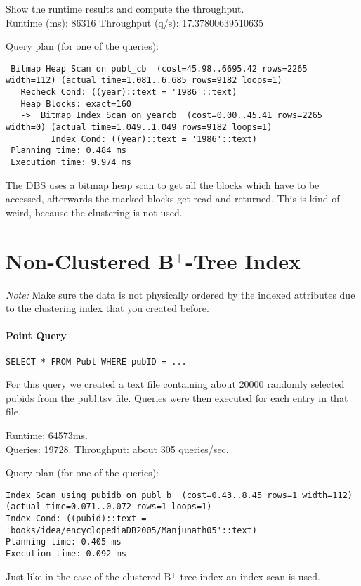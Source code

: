 \documentclass[11pt]{scrartcl}
\begin{document}
\smallskip\noindent
Show the runtime results and compute the throughput.\\
Runtime (ms): 86316
Throughput (q/s): 17.37800639510635

\smallskip\noindent
Query plan (for one of the queries):
{\small
\begin{verbatim}
 Bitmap Heap Scan on publ_cb  (cost=45.98..6695.42 rows=2265 width=112) (actual time=1.081..6.685 rows=9182 loops=1)
   Recheck Cond: ((year)::text = '1986'::text)
   Heap Blocks: exact=160
   ->  Bitmap Index Scan on yearcb  (cost=0.00..45.41 rows=2265 width=0) (actual time=1.049..1.049 rows=9182 loops=1)
         Index Cond: ((year)::text = '1986'::text)
 Planning time: 0.484 ms
 Execution time: 9.974 ms
\end{verbatim}
}
The DBS uses a bitmap heap scan to get all the blocks which have to be accessed, afterwards the marked blocks get read and returned. This is kind of weird, because the clustering is not used.

\newpage
\section{Non-Clustered B$^+$-Tree Index}

\noindent \emph{Note:} Make sure the data is not physically ordered by
the indexed attributes due to the clustering index that you created
before.

\paragraph{Point Query}

{\small
\begin{verbatim}
SELECT * FROM Publ WHERE pubID = ...
\end{verbatim}
}

\noindent
For this query we created a text file containing about 20000 randomly selected pubids from the publ.tsv file. Queries were then executed for each entry in that file.

\smallskip\noindent
Runtime: 64573ms. \\
Queries: 19728.
Throughput: about 305 queries/sec.

\smallskip\noindent
Query plan (for one of the queries):
{\small
\begin{verbatim}
Index Scan using pubidb on publ_b  (cost=0.43..8.45 rows=1 width=112) (actual time=0.071..0.072 rows=1 loops=1)
Index Cond: ((pubid)::text = 'books/idea/encyclopediaDB2005/Manjunath05'::text)
Planning time: 0.405 ms
Execution time: 0.092 ms
\end{verbatim}
Just like in the case of the clustered B$^+$-tree index an index scan is used.
}
\end{document}
